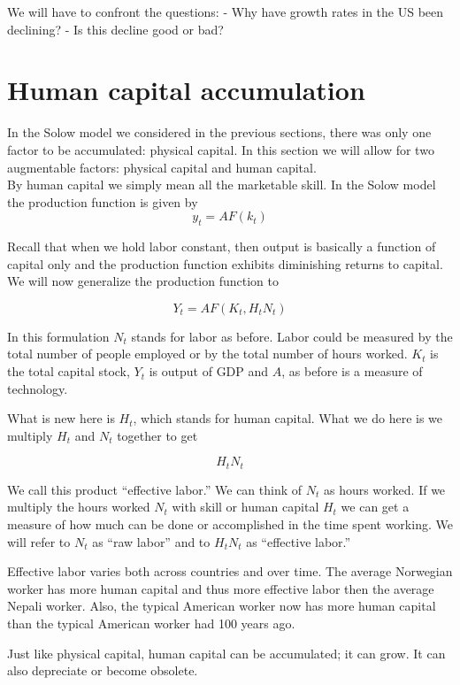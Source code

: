 \documentclass[
]{book}
\begin{document}
We will have to confront the questions:
- Why have growth rates in the US been declining?
- Is this decline good or bad?

\hypertarget{human-capital-accumulation}{%
\section{Human capital accumulation}\label{human-capital-accumulation}}

In the Solow model we considered in the previous sections, there was only one factor to be accumulated: physical capital. In this section we will allow for two augmentable factors: physical capital and human capital.\\
By human capital we simply mean all the marketable skill. In the Solow model the production function is given by
\[y_t=A F(k_t)\]

Recall that when we hold labor constant, then output is basically a function of capital only and the production function exhibits diminishing returns to capital.
We will now generalize the production function to

\[Y_t = A F (K_t, H_tN_t)\]

In this formulation \(N_t\) stands for labor as before. Labor could be measured by the total number of people employed or by the total number of hours worked. \(K_t\) is the total capital stock, \(Y_t\) is output of GDP and \(A\), as before is a measure of technology.

What is new here is \(H_t\), which stands for human capital. What we do here is we multiply \(H_t\) and \(N_t\) together to get

\[H_tN_t\]

We call this product ``effective labor.'' We can think of \(N_t\) as hours worked. If we multiply the hours worked \(N_t\) with skill or human capital \(H_t\) we can get a measure of how much can be done or accomplished in the time spent working. We will refer to \(N_t\) as ``raw labor'' and to \(H_tN_t\) as ``effective labor.''

Effective labor varies both across countries and over time. The average Norwegian worker has more human capital and thus more effective labor then the average Nepali worker. Also, the typical American worker now has more human capital than the typical American worker had 100 years ago.

Just like physical capital, human capital can be accumulated; it can grow. It can also depreciate or become obsolete.
\end{document}
